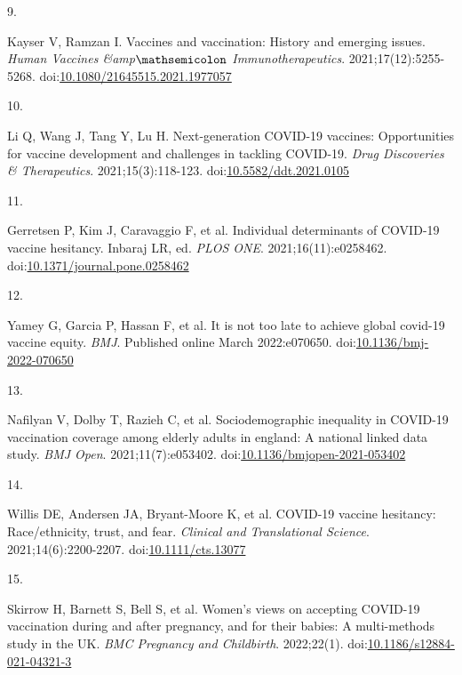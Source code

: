 \documentclass[
  letterpaper,
  DIV=11,
  numbers=noendperiod]{scrartcl}
\newlength{\cslhangindent}
\newlength{\csllabelwidth}
\newlength{\cslentryspacingunit} %
\newenvironment{CSLReferences}[2] %
 {%
  \setlength{\parindent}{0pt}
  \ifodd #1
  \let\oldpar\par
  \def\par{\hangindent=\cslhangindent\oldpar}
  \fi
  \setlength{\parskip}{#2\cslentryspacingunit}
 }%
 {}
\newcommand{\CSLLeftMargin}[1]{\parbox[t]{\csllabelwidth}{#1}}
\newcommand{\CSLRightInline}[1]{\parbox[t]{\linewidth - \csllabelwidth}{#1}\break}
\begin{document}
\begin{CSLReferences}{0}{0}
\leavevmode{}%
\CSLLeftMargin{9. }%
\CSLRightInline{Kayser V, Ramzan I. Vaccines and vaccination: History
and emerging issues. \emph{Human Vaccines {\&}amp\(\mathsemicolon\)
Immunotherapeutics}. 2021;17(12):5255-5268.
doi:\href{https://doi.org/10.1080/21645515.2021.1977057}{10.1080/21645515.2021.1977057}}

\leavevmode{}%
\CSLLeftMargin{10. }%
\CSLRightInline{Li Q, Wang J, Tang Y, Lu H. Next-generation COVID-19
vaccines: Opportunities for vaccine development and challenges in
tackling COVID-19. \emph{Drug Discoveries \& Therapeutics}.
2021;15(3):118-123.
doi:\href{https://doi.org/10.5582/ddt.2021.0105}{10.5582/ddt.2021.0105}}

\leavevmode{}%
\CSLLeftMargin{11. }%
\CSLRightInline{Gerretsen P, Kim J, Caravaggio F, et al. Individual
determinants of {COVID}-19 vaccine hesitancy. Inbaraj LR, ed.
\emph{{PLOS} {ONE}}. 2021;16(11):e0258462.
doi:\href{https://doi.org/10.1371/journal.pone.0258462}{10.1371/journal.pone.0258462}}

\leavevmode{}%
\CSLLeftMargin{12. }%
\CSLRightInline{Yamey G, Garcia P, Hassan F, et al. It is not too late
to achieve global covid-19 vaccine equity. \emph{{BMJ}}. Published
online March 2022:e070650.
doi:\href{https://doi.org/10.1136/bmj-2022-070650}{10.1136/bmj-2022-070650}}

\leavevmode{}%
\CSLLeftMargin{13. }%
\CSLRightInline{Nafilyan V, Dolby T, Razieh C, et al. Sociodemographic
inequality in {COVID}-19 vaccination coverage among elderly adults in
england: A national linked data study. \emph{{BMJ} Open}.
2021;11(7):e053402.
doi:\href{https://doi.org/10.1136/bmjopen-2021-053402}{10.1136/bmjopen-2021-053402}}

\leavevmode{}%
\CSLLeftMargin{14. }%
\CSLRightInline{Willis DE, Andersen JA, Bryant-Moore K, et al.
{COVID}-19 vaccine hesitancy: Race/ethnicity, trust, and fear.
\emph{Clinical and Translational Science}. 2021;14(6):2200-2207.
doi:\href{https://doi.org/10.1111/cts.13077}{10.1111/cts.13077}}

\leavevmode{}%
\CSLLeftMargin{15. }%
\CSLRightInline{Skirrow H, Barnett S, Bell S, et al. Women's views on
accepting {COVID}-19 vaccination during and after pregnancy, and for
their babies: A multi-methods study in the {UK}. \emph{{BMC} Pregnancy
and Childbirth}. 2022;22(1).
doi:\href{https://doi.org/10.1186/s12884-021-04321-3}{10.1186/s12884-021-04321-3}}


\end{CSLReferences}
\end{document}
